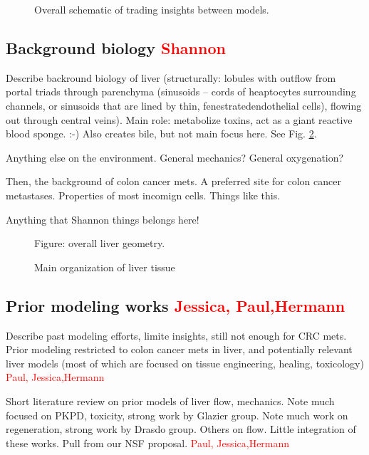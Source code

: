 \documentclass[smallextended,natbib]{svjour3}
\newcommand{\red}[1]{\textcolor{red}{#1}}
\begin{document}
\begin{figure}\sidecaption 
\caption{Overall schematic of trading insights between models.}
\label{fig:multiscale_models}
\end{figure}



\subsection{Background biology \red{Shannon}}
Describe backround biology of liver (structurally: lobules with outflow from portal triads through parenchyma (sinusoids -- cords of heaptocytes surrounding channels, or sinusoids that are lined by thin, fenestratedendothelial cells), flowing out through central veins). Main role: metabolize toxins, act as a giant reactive blood sponge. :-) Also creates bile, but not main focus here.  
See Fig. \ref{fig:liver_schematic}. 

Anything else on the environment. General mechanics? General oxygenation? 

Then, the background of colon cancer mets. A preferred site for colon cancer metastases. Properties of most incomign cells. Things like this. 

Anything that Shannon things belongs here! 

\begin{figure}[tbh]
Figure: overall liver geometry. 
\caption{Main organization of liver tissue} 
\label{fig:liver_schematic}
\end{figure}

\subsection{Prior modeling works \red{Jessica, Paul,Hermann}}
Describe past modeling efforts, limite insights, still not enough for CRC mets. Prior modeling restricted to colon cancer mets in 
liver, and potentially relevant liver models (most of which are focused on tissue engineering, healing, toxicology) \red{Paul, Jessica,Hermann}


Short literature review on prior models of liver flow, mechanics. 
Note much focused on PKPD, toxicity, strong work by Glazier group. 
Note much work on regeneration, strong work by Drasdo group. 
Others on flow. 
Little integration of these works. 
Pull from our NSF proposal. \red{Paul, Jessica,Hermann}
\end{document}
